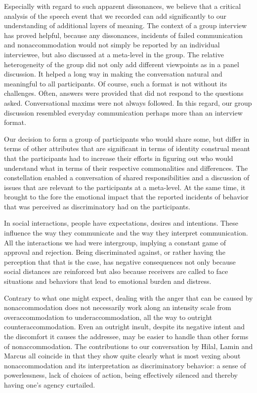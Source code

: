 \documentclass[output=paper,colorlinks,citecolor=brown]{langscibook}
\begin{document}
Especially with regard to such apparent dissonances, we believe that a critical analysis of the speech event that we recorded can add significantly to our understanding of additional layers of meaning. The context of a group interview has proved helpful, because any dissonances, incidents of failed communication and nonaccommodation would not simply be reported by an individual interviewee, but also discussed at a meta-level in the group. The relative heterogeneity of the group did not only add different viewpoints as in a panel discussion. It helped a long way in making the conversation natural and meaningful to all participants. Of course, such a format is not without its challenges. Often, answers were provided that did not respond to the questions asked. Conversational maxims were not always followed. In this regard, our group discussion resembled everyday communication perhaps more than an interview format. 

Our decision to form a group of participants who would share some, but differ in terms of other attributes that are significant in terms of identity construal meant that the participants had to increase their efforts in figuring out who would understand what in terms of their respective commonalities and differences. The constellation enabled a conversation of shared responsibilities and a discussion of issues that are relevant to the participants at a meta-level. At the same time, it brought to the fore the emotional impact that the reported incidents of behavior that was perceived as discriminatory had on the participants. 

In social interactions, people have expectations, desires and intentions. These influence the way they communicate and the way they interpret communication. All the interactions we had were intergroup, implying a constant game of approval and rejection. Being discriminated against, or rather having the perception that that is the case, has negative consequences not only because social distances are reinforced but also because receivers are called to face situations and behaviors that lead to emotional burden and distress. 

Contrary to what one might expect, dealing with the anger that can be caused by nonaccommodation does not necessarily work along an intensity scale from overaccommodation to underaccommodation, all the way to outright counteraccommodation. Even an outright insult, despite its negative intent and the discomfort it causes the addressee, may be easier to handle than other forms of nonaccommodation. The contributions to our conversation by Hilal, Lamin and Marcus all coincide in that they show quite clearly what is most vexing about nonaccommodation and its interpretation as discriminatory behavior: a sense of powerlessness, lack of choices of action, being effectively silenced and thereby having one's agency curtailed. 
\end{document}
